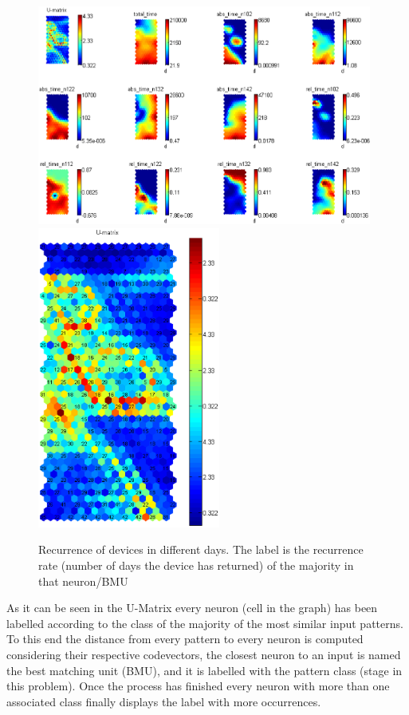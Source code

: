 \documentclass[preprint]{elsarticle}
\begin{document}
\begin{figure}[!htp]
	\begin{center}
		\includegraphics[width=11cm]{imgs/DISCO/som_recurrentes.eps}
		\includegraphics[width=6cm]{imgs/DISCO/umatrix_recurrentes.eps}
		\caption{Recurrence of devices in different days. The label is the recurrence rate (number of days the device has returned) of the majority in that neuron/BMU}
		\label{fig:som_disco_recurrencia}
	\end{center}
\end{figure}

As it can be seen in the U-Matrix every neuron (cell in the graph) has been labelled according to the class of the majority of the most similar input patterns. To this end the distance from every pattern to every neuron is computed considering their respective codevectors, the closest neuron to an input is named the best matching unit (BMU), and it is labelled with the pattern class (stage in this problem). Once the process has finished every neuron with more than one associated class finally displays the label with more occurrences.
\end{document}
